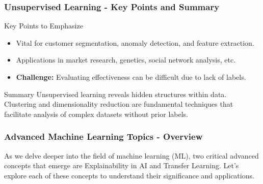 \documentclass[aspectratio=169]{beamer}
\begin{document}
\begin{frame}[fragile]
    \frametitle{Unsupervised Learning - Key Points and Summary}
    \begin{block}{Key Points to Emphasize}
        \begin{itemize}
            \item Vital for customer segmentation, anomaly detection, and feature extraction.
            \item Applications in market research, genetics, social network analysis, etc.
            \item \textbf{Challenge:} Evaluating effectiveness can be difficult due to lack of labels.
        \end{itemize}
    \end{block}
    \begin{block}{Summary}
        Unsupervised learning reveals hidden structures within data. Clustering and dimensionality reduction are fundamental techniques that facilitate analysis of complex datasets without prior labels.
    \end{block}
\end{frame}

\begin{frame}[fragile]
  \frametitle{Advanced Machine Learning Topics - Overview}
  As we delve deeper into the field of machine learning (ML), two critical advanced concepts that emerge are Explainability in AI and Transfer Learning. Let's explore each of these concepts to understand their significance and applications.
\end{frame}
\end{document}

